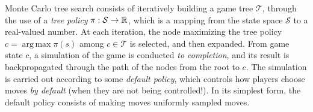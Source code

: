 \documentclass{paper}
\DeclareMathOperator*{\argmax}{arg\,max}
\begin{document}

Monte Carlo tree search consists of iteratively building a game tree $\mathcal{T}$, through the use of a \textit{tree policy} $\pi:\mathcal{S}\to\mathbb{R}$, which is a mapping from the state space $\mathcal{S}$ to a real-valued number. At each iteration, the node maximizing the tree policy $c = \displaystyle\argmax{\pi}(s)$ among $c\in\mathcal{T}$ is selected, and then expanded. From game state $c$, a simulation of the game is conducted \textit{to completion}, and its result is backpropagated through the path of the nodes from the root to $c$. The simulation is carried out according to some \textit{default policy}, which controls how players choose moves \textit{by default} (when they are not being controlled!). In its simplest form, the default policy consists of making moves uniformly sampled moves. 
\end{document}
